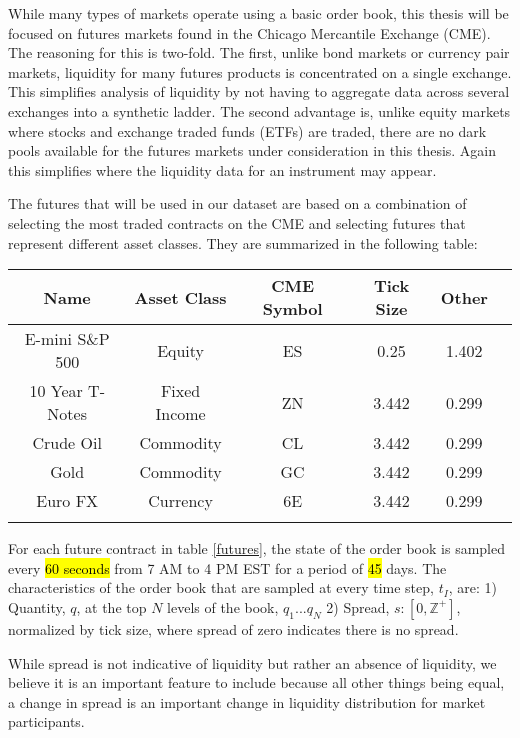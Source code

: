 While many types of markets operate using a basic order book, this thesis will be focused on futures markets found in the Chicago Mercantile Exchange (CME). The reasoning for this is two-fold. The first, unlike bond markets or currency pair markets, liquidity for many futures products is concentrated on a single exchange. This simplifies analysis of liquidity by not having to aggregate data across several exchanges into a synthetic ladder. The second advantage is, unlike equity markets where stocks and exchange traded funds (ETFs) are traded, there are no dark pools available for the futures markets under consideration in this thesis. Again this simplifies where the liquidity data for an instrument may appear.

The futures that will be used in our dataset are based on a combination of selecting the most traded contracts on the CME and selecting futures that represent different asset classes. They are summarized in the following table:

\begin{center}
\begin{tabular}{SSSSSS} \toprule
    {Name} & {Asset Class} & {CME Symbol} & {Tick Size} & {Other}  \\ \midrule
    {E-mini S\&P 500}  & {Equity} & {ES} & 0.25 & 1.402  \\
    {10 Year T-Notes}  & {Fixed Income}  & {ZN} & 3.442  & 0.299  \\
    {Crude Oil}  & {Commodity}  & {CL} & 3.442  & 0.299  \\
    {Gold} & {Commodity}  & {GC} & 3.442  & 0.299  \\
    {Euro FX}  & {Currency}  & {6E} & 3.442  & 0.299  \\ \bottomrule
\label{futures}
\end{tabular}
\end{center}

For each future contract in table \ref{futures}, the state of the order book is sampled every \hl{60 seconds} from 7 AM to 4 PM EST for a period of \hl{45} days. The characteristics of the order book that are sampled at every time step, $t_I$, are:
1) Quantity, $q$, at the top $N$ levels of the book, $q_1 ... q_N$ 
2) Spread, $s: [0, \mathbb{Z}^+]$, normalized by tick size, where spread of zero indicates there is no spread.

While spread is not indicative of liquidity but rather an absence of liquidity, we believe it is an important feature to include because all other things being equal, a change in spread is an important change in liquidity distribution for market participants. 